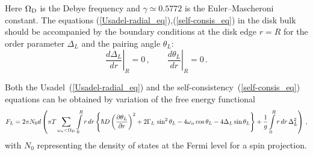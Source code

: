 \documentclass[prx,twocolumn,aps,superscriptaddress,showpacs,amsmath,amssymb,footnoteinbib]{revtex4-1}
\begin{document}
%
Here $\Omega_{\rm D}$ is the Debye frequency and $\gamma \simeq
\mathrm{0.5772}$ is the Euler--Mascheroni constant. The equations
(\ref{Usadel-radial_eq}),(\ref{self-consis_eq}) in the disk bulk should be
accompanied by the boundary conditions at the disk edge
$r = R$ for the order parameter $\Delta_L$ and the pairing angle $\theta_L$:
%
\begin{equation}\label{edge_bound-cond}
 \left.\frac{d \Delta_L} {d r}\right|_{R} = 0\,, \qquad \left.\frac{d \theta_L} {d r}\right|_{R} = 0\,.
\end{equation}
%
\begin{widetext}
Both the Usadel~(\ref{Usadel-radial_eq}) and the
self-consistency~(\ref{self-consis_eq}) equations can be obtained
by variation of the free energy functional
%
\begin{equation}\label{usadelfull}
    F_L = 2 \pi N_0 d \left( \pi T \sum\limits_{\omega_n < \Omega_{\rm D}}
        \int\limits_{0}^{R} r\,d r \left\{ \hbar D \left(\frac{\partial\theta_L}{\partial  r}\right)^2
        + 2 \Gamma_L\,\sin^2\theta_L  - 4 \omega_n \cos\theta_L - 4 \Delta_L \sin\theta_L \right\}
        + \frac{1}{ g } \int\limits_{0}^{R} r\,d r\, \Delta_L^2 \right)\,,
\end{equation}
%
with $N_0$ representing the density of states at the Fermi level for a
spin projection. %


\end{widetext}
\end{document}
